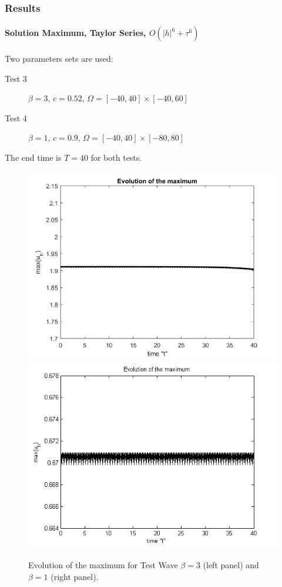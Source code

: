 \documentclass{beamer}
\begin{document}
\begin{frame}
\frametitle{Results}
\framesubtitle{Solution Maximum, Taylor Series, $O(|h|^6+\tau^6)$}

Two parameters sets are used:
\begin{description}
 \item[Test 3] $\beta = 3$, $c = 0.52$, $\Omega = [-40, 40] \times [-40, 60]$
 \item[Test 4] $\beta = 1$, $c = 0.9$, $\Omega = [-40, 40] \times [-80, 80]$
\end{description}
The end time is $T=40$ for both tests.
\begin{figure}[ht]
	\centering
	\begin{minipage}[b]{0.4\linewidth}
		\includegraphics[width=\linewidth]{../amitans/figures/EvolutionOfMaximum_bt3_t40.png}
	\end{minipage}	
	\begin{minipage}[b]{0.4\linewidth}
		 \includegraphics[width=\linewidth]{../amitans/figures/EvolutionOfMaximum_bt1_t40.png}
	\end{minipage}

Evolution of the maximum for Test Wave $\beta =3$ (left panel) and $\beta=1$ (right panel).
\end{figure}

\end{frame}
\end{document}
